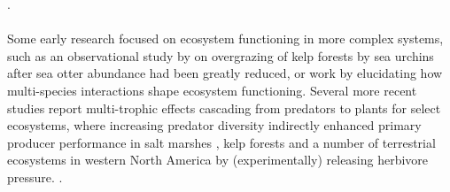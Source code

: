   . \\\\
%
Some early research focused on ecosystem functioning in more complex systems, such as an observational study by \cite{Estes1974} on overgrazing of kelp forests by sea urchins after sea otter abundance had been greatly reduced, or work by \cite{Sih1998} elucidating how multi-species interactions shape ecosystem functioning. 
Several more recent studies report multi-trophic effects cascading from predators to plants for select ecosystems, where increasing predator diversity indirectly enhanced primary producer performance in salt marshes \citep{Finke2004}, kelp forests \citep{Byrnes2006} and a number  of terrestrial ecosystems in western North America \citep{Beschta2009} by (experimentally) releasing herbivore pressure. 
. 

